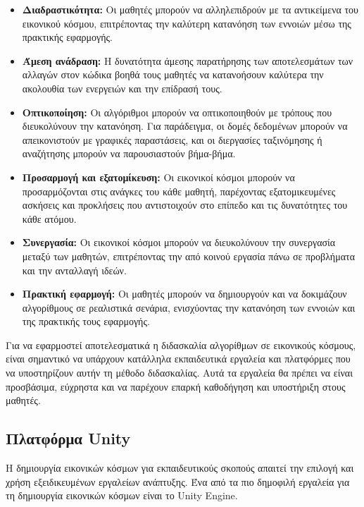 \begin{itemize}
    \item \textbf{Διαδραστικότητα:} Οι μαθητές μπορούν να αλληλεπιδρούν με τα αντικείμενα του εικονικού κόσμου, επιτρέποντας την καλύτερη κατανόηση των εννοιών μέσω της πρακτικής εφαρμογής.
    \item \textbf{Άμεση ανάδραση:} Η δυνατότητα άμεσης παρατήρησης των αποτελεσμάτων των αλλαγών στον κώδικα βοηθά τους μαθητές να κατανοήσουν καλύτερα την ακολουθία των ενεργειών και την επίδρασή τους.
    \item \textbf{Οπτικοποίηση:} Οι αλγόριθμοι μπορούν να οπτικοποιηθούν με τρόπους που διευκολύνουν την κατανόηση. Για παράδειγμα, οι δομές δεδομένων μπορούν να απεικονιστούν με γραφικές παραστάσεις, και οι διεργασίες ταξινόμησης ή αναζήτησης μπορούν να παρουσιαστούν βήμα-βήμα.
    \item \textbf{Προσαρμογή και εξατομίκευση:} Οι εικονικοί κόσμοι μπορούν να προσαρμόζονται στις ανάγκες του κάθε μαθητή, παρέχοντας εξατομικευμένες ασκήσεις και προκλήσεις που αντιστοιχούν στο επίπεδο και τις δυνατότητες του κάθε ατόμου.
    \item \textbf{Συνεργασία:} Οι εικονικοί κόσμοι μπορούν να διευκολύνουν την συνεργασία μεταξύ των μαθητών, επιτρέποντας την από κοινού εργασία πάνω σε προβλήματα και την ανταλλαγή ιδεών.
    \item \textbf{Πρακτική εφαρμογή:} Οι μαθητές μπορούν να δημιουργούν και να δοκιμάζουν αλγορίθμους σε ρεαλιστικά σενάρια, ενισχύοντας την κατανόηση των εννοιών και της πρακτικής τους εφαρμογής\cite{damasevicius_virtual_2024,rossiou_using_2009}.
\end{itemize}

Για να εφαρμοστεί αποτελεσματικά η διδασκαλία αλγορίθμων σε εικονικούς κόσμους, είναι σημαντικό να υπάρχουν κατάλληλα εκπαιδευτικά εργαλεία και πλατφόρμες που να υποστηρίζουν αυτήν τη μέθοδο διδασκαλίας. Αυτά τα εργαλεία θα πρέπει να είναι προσβάσιμα, εύχρηστα και να παρέχουν επαρκή καθοδήγηση και υποστήριξη στους μαθητές.


\subsection{Πλατφόρμα Unity}

Η δημιουργία εικονικών κόσμων για εκπαιδευτικούς σκοπούς απαιτεί την επιλογή και χρήση εξειδικευμένων εργαλείων ανάπτυξης. Ένα από τα πιο δημοφιλή εργαλεία για τη δημιουργία εικονικών κόσμων είναι το Unity Engine.

